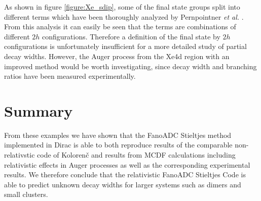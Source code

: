 As shown in figure \ref{figure:Xe_sdip}, some of the final state groups
split into different terms which have been thoroughly analyzed by
Pernpointner \textit{et al.} \cite{Pernpointner12_2}. From this analysis
it can easily be seen that the terms are combinations of different $2h$
configurations. Therefore a definition of the final state by $2h$
configurations is unfortunately insufficient for a more detailed
study of partial decay widths.
However, the Auger process from the Xe4d region with an improved method
would be worth investigating, since decay width and branching ratios have been
measured experimentally. \cite{Aksela94}


\section{Summary}
From these examples we have shown that the FanoADC Stieltjes method implemented
in Dirac is able to both reproduce results of the comparable non-relativstic
code of Koloren\v{c}  and results from \ac{MCDF} calculations
including relativistic effects in Auger processes as well as the corresponding
experimental results.
We therefore conclude that the relativistic FanoADC Stieltjes Code is able
to predict unknown decay widths for larger systems such as dimers and small
clusters.
